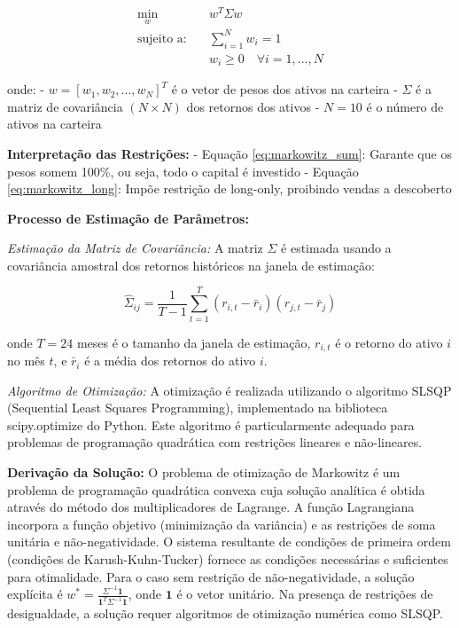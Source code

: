 \begin{align}
\min_{w} \quad & w^T \Sigma w \label{eq:markowitz_obj} \\
\text{sujeito a:} \quad & \sum_{i=1}^{N} w_i = 1 \label{eq:markowitz_sum} \\
& w_i \geq 0 \quad \forall i = 1, ..., N \label{eq:markowitz_long}
\end{align}

onde:
- $w = [w_1, w_2, ..., w_N]^T$ é o vetor de pesos dos ativos na carteira
- $\Sigma$ é a matriz de covariância $(N \times N)$ dos retornos dos ativos
- $N = 10$ é o número de ativos na carteira

\textbf{Interpretação das Restrições:}
- Equação \ref{eq:markowitz_sum}: Garante que os pesos somem 100\%, ou seja, todo o capital é investido
- Equação \ref{eq:markowitz_long}: Impõe restrição de long-only, proibindo vendas a descoberto

\textbf{Processo de Estimação de Parâmetros:}

\textit{Estimação da Matriz de Covariância:} A matriz $\Sigma$ é estimada usando a covariância amostral dos retornos históricos na janela de estimação:

\begin{equation}
\hat{\Sigma}_{ij} = \frac{1}{T-1} \sum_{t=1}^{T} (r_{i,t} - \bar{r}_i)(r_{j,t} - \bar{r}_j)
\end{equation}

onde $T = 24$ meses é o tamanho da janela de estimação, $r_{i,t}$ é o retorno do ativo $i$ no mês $t$, e $\bar{r}_i$ é a média dos retornos do ativo $i$.

\textit{Algoritmo de Otimização:} A otimização é realizada utilizando o algoritmo SLSQP (Sequential Least Squares Programming), implementado na biblioteca scipy.optimize do Python. Este algoritmo é particularmente adequado para problemas de programação quadrática com restrições lineares e não-lineares.

\textbf{Derivação da Solução:} O problema de otimização de Markowitz é um problema de programação quadrática convexa cuja solução analítica é obtida através do método dos multiplicadores de Lagrange. A função Lagrangiana incorpora a função objetivo (minimização da variância) e as restrições de soma unitária e não-negatividade. O sistema resultante de condições de primeira ordem (condições de Karush-Kuhn-Tucker) fornece as condições necessárias e suficientes para otimalidade. Para o caso sem restrição de não-negatividade, a solução explícita é $w^* = \frac{\Sigma^{-1}\mathbf{1}}{\mathbf{1}^T\Sigma^{-1}\mathbf{1}}$, onde $\mathbf{1}$ é o vetor unitário. Na presença de restrições de desigualdade, a solução requer algoritmos de otimização numérica como SLSQP.

